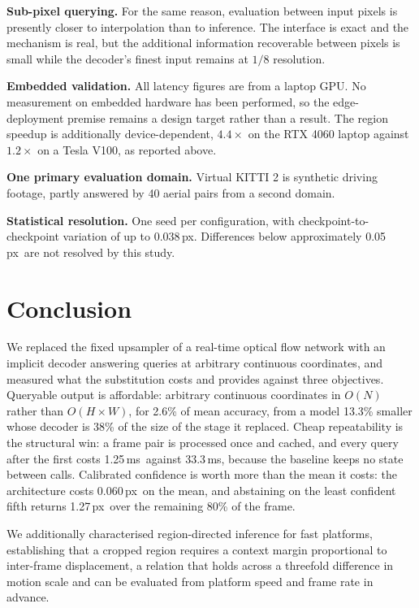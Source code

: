 \documentclass[conference]{IEEEtran}
\newcommand{\px}{\,px}
\newcommand{\ms}{\,ms}
\begin{document}
\textbf{Sub-pixel querying.} For the same reason, evaluation between input pixels
is presently closer to interpolation than to inference. The interface is exact
and the mechanism is real, but the additional information recoverable between
pixels is small while the decoder's finest input remains at $1/8$ resolution.

\textbf{Embedded validation.} All latency figures are from a laptop GPU. No
measurement on embedded hardware has been performed, so the edge-deployment
premise remains a design target rather than a result. The region speedup is
additionally device-dependent, $4.4\times$ on the RTX 4060 laptop against
$1.2\times$ on a Tesla V100, as reported above.

\textbf{One primary evaluation domain.} Virtual KITTI 2 is synthetic driving
footage, partly answered by 40 aerial pairs from a second domain.

\textbf{Statistical resolution.} One seed per configuration, with
checkpoint-to-checkpoint variation of up to 0.038\px. Differences below
approximately 0.05\px\ are not resolved by this study.

\section{Conclusion}

We replaced the fixed upsampler of a real-time optical flow network with an
implicit decoder answering queries at arbitrary continuous coordinates, and
measured what the substitution costs and provides against three objectives.
Queryable output is affordable: arbitrary continuous coordinates in $O(N)$ rather
than $O(H{\times}W)$, for 2.6\% of mean accuracy, from a model 13.3\% smaller
whose decoder is 38\% of the size of the stage it replaced. Cheap repeatability
is the structural win: a frame pair is processed once and cached, and every query
after the first costs 1.25\ms\ against 33.3\ms, because the baseline keeps no
state between calls. Calibrated confidence is worth more than the mean it costs:
the architecture costs 0.060\px\ on the mean, and abstaining on the least
confident fifth returns 1.27\px\ over the remaining 80\% of the frame.

We additionally characterised region-directed inference for fast platforms,
establishing that a cropped region requires a context margin proportional to
inter-frame displacement, a relation that holds across a threefold difference in
motion scale and can be evaluated from platform speed and frame rate in advance.
\end{document}
